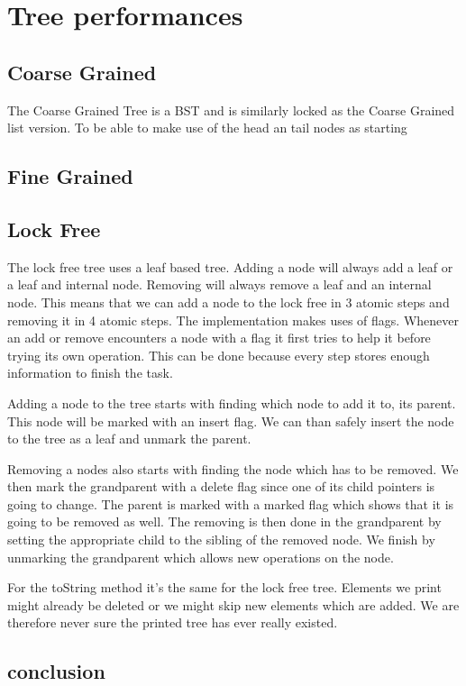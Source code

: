 \documentclass[10pt,a4paper]{article}
\begin{document}
\section{Tree performances}
\subsection{Coarse Grained}
The Coarse Grained Tree is a BST and is similarly locked as the Coarse Grained list version. To be able to make use of the head an tail nodes as starting 
\subsection{Fine Grained}

\subsection{Lock Free}
The lock free tree uses a leaf based tree. Adding a node will always add a leaf or a leaf and internal node. Removing will always remove a leaf and an internal node. This means that we can add a node to the lock free in 3 atomic steps and removing it in 4 atomic steps. The implementation makes uses of flags. Whenever an add or remove encounters a node with a flag it first tries to help it before trying its own operation. This can be done because every step stores enough information to finish the task.

Adding a node to the tree starts with finding which node to add it to, its parent. This node will be marked with an insert flag. We can than safely insert the node to the tree as a leaf and unmark the parent. 

Removing a nodes also starts with finding the node which has to be removed. We then mark the grandparent with a delete flag since one of its child pointers is going to change. The parent is marked with a marked flag which shows that it is going to be removed as well. The removing is then done in the grandparent by setting the appropriate child to the sibling of the removed node. We finish by unmarking the grandparent which allows new operations on the node.

For the toString method it's the same for the lock free tree. Elements we print might already be deleted or we might skip new elements which are added. We are therefore never sure the printed tree has ever really existed.


\subsection{conclusion}
\end{document}
